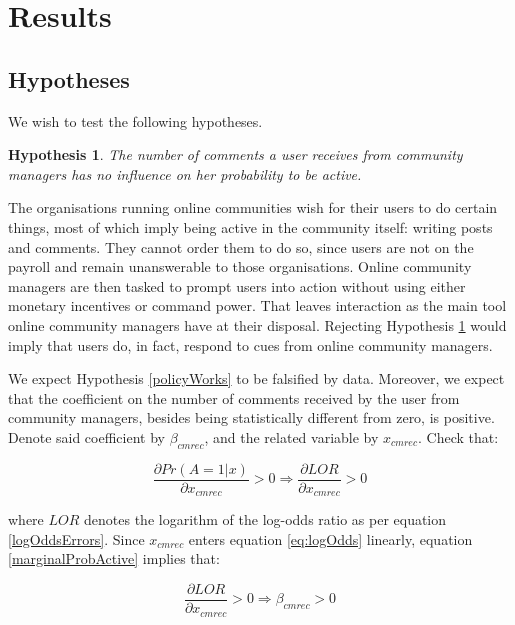 \section{Results}

\subsection{Hypotheses}

We wish to test the following hypotheses.

\newtheorem{policyWorks}{Hypothesis}

\begin{policyWorks}
	The number of comments a user receives from community managers has no influence on her probability to be active.
	\label{hypothesis:policyWorks}
\end{policyWorks}

The organisations running online communities wish for their users to do certain things, most of which imply being active in the community itself: writing posts and comments. They cannot order them to do so, since users are not on the payroll and remain unanswerable to those organisations. Online community managers are then tasked to prompt users into action without using either monetary incentives or command power. That leaves interaction as the main tool online community managers have at their disposal. Rejecting Hypothesis \ref{hypothesis:policyWorks} would imply that users do, in fact, respond to cues from online community managers.

We expect Hypothesis \ref{policyWorks} to be falsified by data. Moreover, we expect that the coefficient on the number of comments received by the user from community managers, besides being statistically different from zero, is positive. Denote said coefficient by  $\beta_{cmrec}$, and the related variable by $x_{cmrec}$. Check that: 

\begin{equation}
	\frac{\partial Pr(A=1|x)}{\partial x_{cmrec}} > 0 \Rightarrow \frac{\partial LOR}{\partial x_{cmrec}} > 0
	\label{marginalProbActive}
\end{equation}

where $LOR$ denotes the logarithm of the log-odds ratio as per equation \ref{logOddsErrors}. Since $x_{cmrec}$ enters equation \ref{eq:logOdds} linearly, equation \ref{marginalProbActive} implies that:

\begin{equation}
	\frac{\partial LOR}{\partial x_{cmrec}} > 0 \Rightarrow \beta_{cmrec} > 0 
\end {equation}


